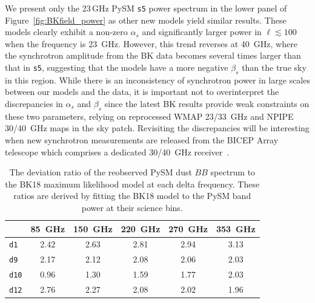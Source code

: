 \documentclass[twocolumn]{aastex631}
\begin{document}

We present only the 23\,GHz PySM \texttt{s5} power spectrum in the lower panel of Figure~\ref{fig:BKfield_power} as other new models yield similar results. These models clearly exhibit a non-zero $\alpha_s$ and significantly larger power in $\ell \lesssim 100$ when the frequency is 23~GHz. However, this trend reverses at 40~GHz, where the synchrotron amplitude from the BK data becomes several times larger than that in \texttt{s5}, suggesting that the models have a more negative $\beta_s$ than the true sky in this region. While there is an inconsistency of synchrotron power in large scales between our models and the data, it is important not to overinterpret the discrepancies in $\alpha_s$ and $\beta_s$ since the latest BK results provide weak constraints on these two parameters, relying on reprocessed WMAP 23/33~GHz and NPIPE 30/40~GHz maps in the sky patch. Revisiting the discrepancies will be interesting when new synchrotron measurements are released from the BICEP Array telescope which comprises a dedicated 30/40~GHz receiver~\citep{Moncelsi:2020}.

\begin{table}
    \centering
    \begin{tabular}{lccccc}
    \toprule 
     & 85~GHz & 150~GHz & 220~GHz & 270~GHz & 353~GHz \\
    \midrule
    \texttt{d1}  & 2.42	& 2.63 & 2.81 & 2.94 & 3.13 \\
    \texttt{d9}  & 2.17 & 2.12 & 2.08 & 2.06 & 2.03 \\
    \texttt{d10} & 0.96 & 1.30 & 1.59 & 1.77 & 2.03 \\
    \texttt{d12} & 2.76	& 2.27 & 2.08 & 2.02 & 1.96 \\
   \bottomrule
    \end{tabular}
    \caption{The deviation ratio of the reobserved PySM dust $BB$ spectrum to the BK18 maximum likelihood model at each delta frequency. These ratios are derived by fitting the BK18 model to the PySM band power at their science bins.}
    \label{tab:BB_dustratio}
\end{table}
\end{document}

